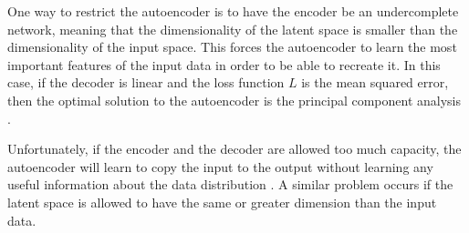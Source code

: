 One way to restrict the autoencoder is to have the encoder be an undercomplete network, meaning that the dimensionality of the latent space is smaller than the dimensionality of the input space. This forces the autoencoder to learn the most important features of the input data in order to be able to recreate it. In this case, if the decoder is linear and the loss function $L$ is the mean squared error, then the optimal solution to the autoencoder is the principal component analysis \cite{Goodfellow-et-al-2016}. 

Unfortunately, if the encoder and the decoder are allowed too much capacity, the autoencoder will learn to copy the input to the output without learning any useful information about the data distribution \cite{Goodfellow-et-al-2016}. A similar problem occurs if the latent space is allowed to have the same or greater dimension than the input data. 

